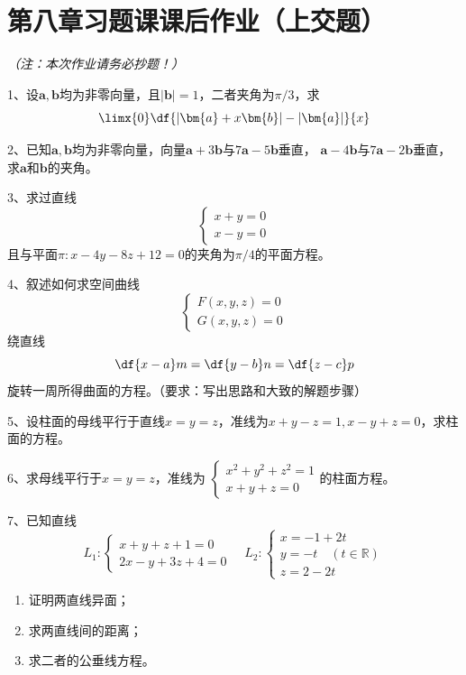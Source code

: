 \newpage

\section*{第八章习题课课后作业（上交题）}

{\it （注：本次作业请务必抄题！）}

\bigskip

1、设$\bm{a},\bm{b}$均为非零向量，且$|\bm{b}|=1$，二者夹角为$\pi/3$，求
$$\limx{0}\df{|\bm{a}+x\bm{b}|-|\bm{a}|}{x}$$

2、已知$\bm{a},\bm{b}$均为非零向量，向量$\bm{a}+3\bm{b}$与$7\bm{a}-5\bm{b}$垂直，
$\bm{a}-4\bm{b}$与$7\bm{a}-2\bm{b}$垂直，求$\bm{a}$和$\bm{b}$的夹角。

3、求过直线
$$\left\{\begin{array}{l}
	x+y=0\\
	x-y=0
\end{array}\right.$$
且与平面$\pi:x-4y-8z+12=0$的夹角为$\pi/4$的平面方程。

4、叙述如何求空间曲线$$\left\{\begin{array}{l}
F(x,y,z)=0\\ G(x,y,z)=0
\end{array}\right.$$绕直线
$$\df{x-a}m=\df{y-b}n=\df{z-c}p$$
旋转一周所得曲面的方程。（要求：写出思路和大致的解题步骤）

5、设柱面的母线平行于直线$x=y=z$，准线为$x+y-z=1,x-y+z=0$，求柱面的方程。

6、求母线平行于$x=y=z$，准线为
$\left\{\begin{array}{l}
	x^2+y^2+z^2=1\\ x+y+z=0
\end{array}\right.$的柱面方程。

7、已知直线
$$L_1:\left\{\begin{array}{l}
	x+y+z+1=0\\
	2x-y+3z+4=0
\end{array}\right.
\quad
L_2:\left\{\begin{array}{l}
	x=-1+2t\\
	y=-t\quad(t\in\mathbb{R})\\
	z=2-2t
\end{array}\right.
$$
\begin{enumerate}[(1)]
  \setlength{\itemindent}{1cm}
  \item 证明两直线异面；
  \item 求两直线间的距离；
  \item 求二者的公垂线方程。
\end{enumerate}


